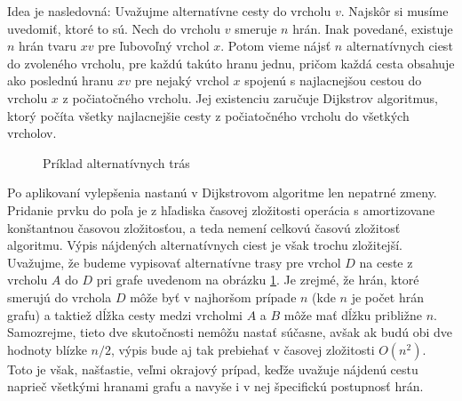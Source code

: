 Idea je nasledovná: Uvažujme alternatívne cesty do vrcholu $v$. Najskôr si musíme uvedomiť, ktoré to sú. Nech do vrcholu $v$ smeruje $n$ hrán. Inak povedané, existuje $n$ hrán tvaru $xv$ pre ľubovoľný vrchol $x$. Potom vieme nájsť $n$ alternatívnych ciest do zvoleného vrcholu, pre každú takúto hranu jednu, pričom každá cesta obsahuje ako poslednú hranu $xv$ pre nejaký vrchol $x$ spojenú s najlacnejšou cestou do vrcholu $x$ z počiatočného vrcholu. Jej existenciu zaručuje Dijkstrov algoritmus, ktorý počíta všetky najlacnejšie cesty z počiatočného vrcholu do všetkých vrcholov.\newline

\begin{figure}[H]
  \caption{Príklad alternatívnych trás}
  \label{alternativ_priklad2}
\end{figure}

Po aplikovaní vylepšenia nastanú v Dijkstrovom algoritme len nepatrné zmeny. Pridanie prvku do poľa je z hľadiska časovej zložitosti operácia s amortizovane konštantnou časovou zložitosťou, a teda nemení celkovú časovú zložitosť algoritmu. Výpis nájdených alternatívnych ciest je však trochu zložitejší. Uvažujme, že budeme vypisovať alternatívne trasy pre vrchol $D$ na ceste z vrcholu $A$ do $D$ pri grafe uvedenom na obrázku \ref{alternativ_priklad2}. Je zrejmé, že hrán, ktoré smerujú do vrchola $D$ môže byť v najhoršom prípade $n$ (kde $n$ je počet hrán grafu) a taktiež dĺžka cesty medzi vrcholmi $A$ a $B$ môže mať dĺžku približne $n$. Samozrejme, tieto dve skutočnosti nemôžu nastať súčasne, avšak ak budú obi dve hodnoty blízke $n/2$, výpis bude aj tak prebiehať v časovej zložitosti $O(n^{2})$. Toto je však, našťastie, veľmi okrajový prípad, keďže uvažuje nájdenú cestu naprieč všetkými hranami grafu a navyše i v nej špecifickú postupnosť hrán.\newline

